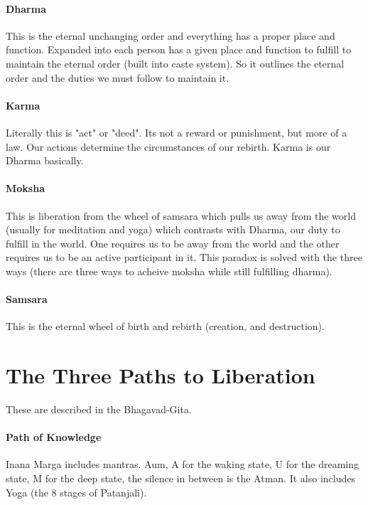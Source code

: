 \documentclass{article}
\begin{document}
\paragraph{Dharma}
\label{par:dharma}
This is the eternal unchanging order and everything has a proper place and function. Expanded into each person has a given place and function to fulfill to maintain the eternal order (built into caste system). So it outlines the eternal order and the duties we must follow to maintain it.

\paragraph{Karma}
\label{par:karma}
Literally this is "act" or "deed". Its not a reward or punishment, but more of a law. Our actions determine the circumstances of our rebirth. Karma is our Dharma basically.

\paragraph{Moksha}
\label{par:moksha}
This is liberation from the wheel of samsara which pulls us away from the world (usually for meditation and yoga) which contrasts with Dharma, our duty to fulfill in the world. One requires us to be away from the world and the other requires us to be an active participant in it. This paradox is solved with the three ways (there are three ways to acheive moksha while still fulfilling dharma).

\paragraph{Samsara}
 \label{par:samsara}
This is the eternal wheel of birth and rebirth (creation, and destruction).

\section*{The Three Paths to Liberation}
\label{sec:the_three_paths_to_liberation}
These are described in the Bhagavad-Gita.

\paragraph{Path of Knowledge}
\label{par:path_of_knowledge}
Inana Marga includes mantras. Aum, A for the waking state, U for the dreaming state, M for the deep state, the silence in between is the Atman. It also includes Yoga (the 8 stages of Patanjali).
\end{document}
